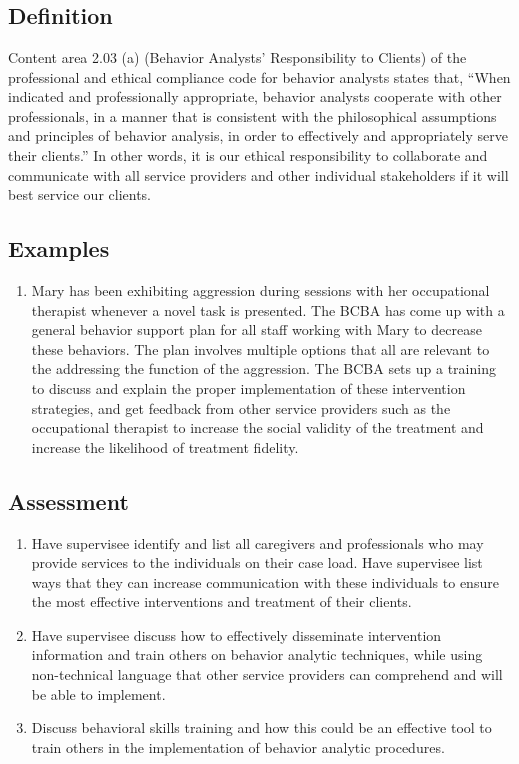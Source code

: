 \clearpage \section[\fourgSix{}]{\fourgSix{}%
              }
\subsection{Definition}
Content area 2.03 (a) (Behavior Analysts' Responsibility to Clients) of the professional and ethical compliance code for behavior analysts states that, ``When indicated and professionally appropriate, behavior analysts cooperate with other professionals, in a manner that is consistent with the philosophical assumptions and principles of behavior analysis, in order to effectively and appropriately serve their clients.'' In other words, it is our ethical responsibility to collaborate and communicate with all service providers and other individual stakeholders if it will best service our clients.
%
\subsection{Examples}
\begin{enumerate}
\item Mary has been exhibiting aggression during sessions with her occupational therapist whenever a novel task is presented. The BCBA has come up with a general behavior support plan for all staff working with Mary to decrease these behaviors. The plan involves multiple options that all are relevant to the addressing the function of the aggression. The BCBA sets up a training to discuss and explain the proper implementation of these intervention strategies, and get feedback from other service providers such as the occupational therapist to increase the social validity of the treatment and increase the likelihood of treatment fidelity.
%
\end{enumerate}
%
\subsection{Assessment}
\begin{enumerate}
\item Have supervisee identify and list all caregivers and professionals who may provide services to the individuals on their case load. Have supervisee list ways that they can increase communication with these individuals to ensure the most effective interventions and treatment of their clients.
\item Have supervisee discuss how to effectively disseminate intervention information and train others on behavior analytic techniques, while using non-technical language that other service providers can comprehend and will be able to implement. 
\item Discuss behavioral skills training and how this could be an effective tool to train others in the implementation of behavior analytic procedures. 
%
\end{enumerate}
%
